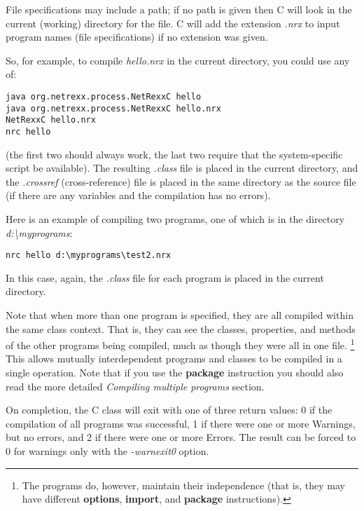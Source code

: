 File specifications may include a path; if no path is given then
\nr{}C will look in the current (working) directory for the file.
\nr{}C will add the extension \emph{.nrx} to input program names (file
specifications) if no extension was given.

So, for example, to compile \emph{hello.nrx} in the current directory,
you could use any of:
\begin{lstlisting}
java org.netrexx.process.NetRexxC hello
java org.netrexx.process.NetRexxC hello.nrx
NetRexxC hello.nrx
nrc hello
\end{lstlisting}
(the first two should always work, the last two require that the
system-specific script be available).  The resulting \emph{.class} file
is placed in the current directory, and the \emph{.crossref}
(cross-reference) file is placed in the same directory as the source
file (if there are any variables and the compilation has no errors).

Here is an example of compiling two programs, one of which is in the
directory \emph{d:\textbackslash myprograms}:
\begin{lstlisting}
nrc hello d:\myprograms\test2.nrx
\end{lstlisting}

In this case, again, the \emph{.class} file for each program is placed
in the current directory.

Note that when more than one program is specified, they are all compiled
within the same class context.  That is, they can see the
classes, properties, and methods of the other programs being compiled,
much as though they were all in one file.
\footnote{The programs do, however, maintain their independence (that is, they may
have different \textbf{options}, \textbf{import}, and \textbf{package}
instructions).}
This allows mutually interdependent programs and classes to be compiled
in a single operation.
Note that if you use the \textbf{package} instruction you should also
read the more detailed \emph{Compiling multiple
programs} section.%

On completion, the \nr{}C class will exit with one of three return
values: 0 if the compilation of all programs was successful, 1 if there
were one or more Warnings, but no errors, and 2 if there were one or
more Errors. The result can be forced to 0 for warnings only with the
\emph{-warnexit0} option.

